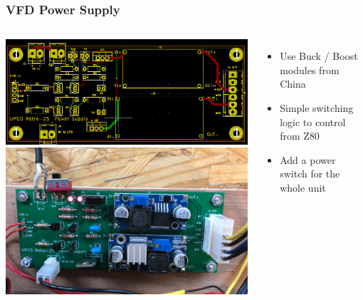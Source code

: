 \documentclass{beamer}
\begin{document}
\begin{frame}
  \frametitle{VFD Power Supply}

  \begin{columns}
  \includegraphics[width=\textwidth]{figs/vfd-ps-layout.png} \\
  \vskip 0.2in
  \includegraphics[width=\textwidth]{figs/power_supply2.jpg}
    \begin{itemize}
    \scriptsize
    \item Use Buck / Boost modules from China
    \item Simple switching logic to control from Z80
    \item Add a power switch for the whole unit
    \end{itemize}
  \end{columns}
\end{frame}
\end{document}
